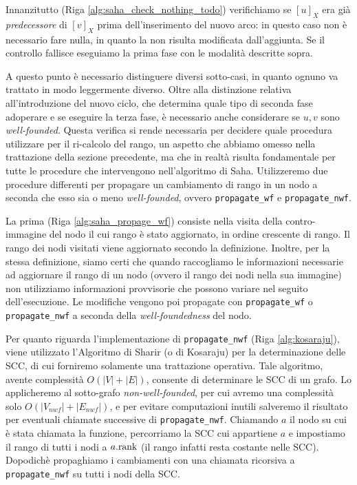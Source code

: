Innanzitutto (Riga \ref{alg:saha_check_nothing_todo}) verifichiamo se $[u]_X$ era già \emph{predecessore} di $[v]_X$ prima dell'inserimento del nuovo arco: in questo caso non è necessario fare nulla, in quanto la \rscpnomath non risulta modificata dall'aggiunta. Se il controllo fallisce eseguiamo la prima fase con le modalità descritte sopra.

A questo punto è necessario distinguere diversi sotto-casi, in quanto ognuno va trattato in modo leggermente diverso. Oltre alla distinzione relativa all'introduzione del nuovo ciclo, che determina quale tipo di seconda fase adoperare e se eseguire la terza fase, è necessario anche considerare se $u,v$ sono \emph{well-founded}. Questa verifica si rende necessaria per decidere quale procedura utilizzare per il ri-calcolo del rango, un aspetto che abbiamo omesso nella trattazione della sezione precedente, ma che in realtà risulta fondamentale per tutte le procedure che intervengono nell'algoritmo di Saha. Utilizzeremo due procedure differenti per propagare un cambiamento di rango in un nodo a seconda che esso sia o meno \emph{well-founded}, ovvero \texttt{propagate\_wf} e \texttt{propagate\_nwf}.

La prima (Riga \ref{alg:saha_propage_wf}) consiste nella visita della contro-immagine del nodo il cui rango è stato aggiornato, in ordine crescente di rango. Il rango dei nodi visitati viene aggiornato secondo la definizione. Inoltre, per la stessa definizione, siamo certi che quando raccogliamo le informazioni necessarie ad aggiornare il rango di un nodo (ovvero il rango dei nodi nella sua immagine) non utilizziamo informazioni provvisorie che possono variare nel seguito dell'esecuzione. Le modifiche vengono poi propagate con \texttt{propagate\_wf} o \texttt{propagate\_nwf} a seconda della \emph{well-foundedness} del nodo.

Per quanto riguarda l'implementazione di \texttt{propagate\_nwf} (Riga \ref{alg:kosaraju}), viene utilizzato l'Algoritmo di Sharir (o di Kosaraju) \cite{sharir} per la determinazione delle SCC, di cui forniremo solamente una trattazione operativa. Tale algoritmo, avente complessità $O(|V| + |E|)$, consente di determinare le SCC di un grafo. Lo applicheremo al sotto-grafo \emph{non-well-founded}, per cui avremo una complessità solo $O(|V_{nwf}| + |E_{nwf}|)$, e per evitare computazioni inutili salveremo il risultato per eventuali chiamate successive di \texttt{propagate\_nwf}. Chiamando $a$ il nodo su cui è stata chiamata la funzione, percorriamo la SCC cui appartiene $a$ e impostiamo il rango di tutti i nodi a $a.\textup{rank}$ (il rango infatti resta costante nelle SCC). Dopodichè propaghiamo i cambiamenti con una chiamata ricorsiva a \texttt{propagate\_nwf} su tutti i nodi della SCC.

